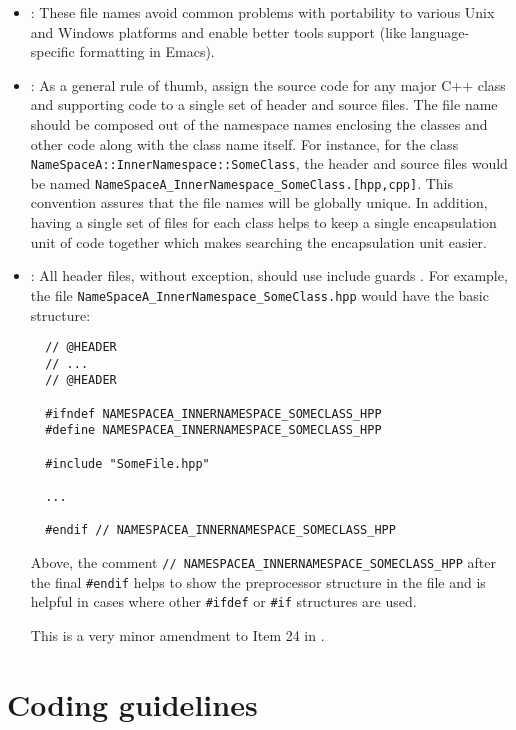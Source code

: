 \begin{itemize}


{}\item\NOSFFileExtension: These file names avoid common problems with
portability to various Unix and Windows platforms and enable better tools
support (like language-specific formatting in Emacs).


{}\item\NOSFClassFiles: As a general rule of thumb, assign the source code for
any major C++ class and supporting code to a single set of header and source
files.  The file name should be composed out of the namespace names enclosing
the classes and other code along with the class name itself.  For instance,
for the class {}\texttt{NameSpaceA\-::InnerNamespace\-::SomeClass}, the header
and source files would be named
{}\texttt{NameSpaceA\-\_InnerNamespace\-\_SomeClass.[hpp,cpp]}.  This
convention assures that the file names will be globally unique.  In addition,
having a single set of files for each class helps to keep a single
encapsulation unit of code together which makes searching the encapsulation
unit easier.


{}\item\NOSFIncludeGuards: All header files, without exception, should use
include guards {}\cite[Item 24]{C++CodingStandards05}.  For example, the file
{}\texttt{NameSpaceA\-\_InnerNamespace\-\_SomeClass.hpp} would have the basic
structure:

{\small\begin{verbatim}
  // @HEADER
  // ...
  // @HEADER

  #ifndef NAMESPACEA_INNERNAMESPACE_SOMECLASS_HPP
  #define NAMESPACEA_INNERNAMESPACE_SOMECLASS_HPP

  #include "SomeFile.hpp"

  ...

  #endif // NAMESPACEA_INNERNAMESPACE_SOMECLASS_HPP
\end{verbatim}}

Above, the comment {}\texttt{//
NAMESPACEA\-\_INNERNAMESPACE\-\_SOMECLASS\-\_HPP} after the final
{}\texttt{\#endif} helps to show the preprocessor structure in the file and is
helpful in cases where other {}\texttt{\#ifdef} or {}\texttt{\#if} structures
are used.

This is a very minor amendment to Item 24 in {}\cite{C++CodingStandards05}.


\end{itemize}


%
\section{Coding guidelines}
\label{tcdg:codingguidelines:sec}
%

